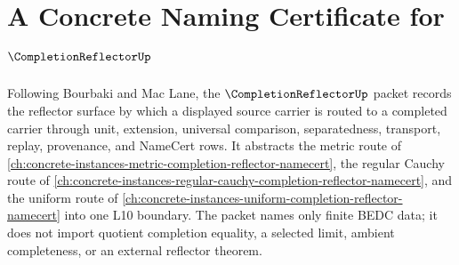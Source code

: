 \chapter{A Concrete Naming Certificate for $\CompletionReflectorUp$}
\label{ch:concrete-instances-completion-reflector-namecert}

Following Bourbaki and Mac Lane, the $\CompletionReflectorUp$ packet records the reflector surface by which a displayed source carrier is routed to a completed carrier through unit, extension, universal comparison, separatedness, transport, replay, provenance, and NameCert rows. It abstracts the metric route of \autoref{ch:concrete-instances-metric-completion-reflector-namecert}, the regular Cauchy route of \autoref{ch:concrete-instances-regular-cauchy-completion-reflector-namecert}, and the uniform route of \autoref{ch:concrete-instances-uniform-completion-reflector-namecert} into one L10 boundary. The packet names only finite BEDC data; it does not import quotient completion equality, a selected limit, ambient completeness, or an external reflector theorem.

